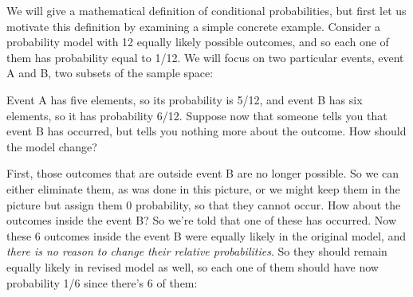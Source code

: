 \documentclass[pdftex, brazil, 12pt, twoside]{article}
\begin{document}
We will give a mathematical definition of conditional
probabilities, but first let us motivate this definition by
examining a simple concrete example.
Consider a probability model with 12 equally likely
possible outcomes, and so each one of them has probability
equal to 1/12.
We will focus on two particular events, event A and
B, two subsets of the sample space:

\begin{figure}[H]
  \begin{center}
  \end{center}
\end{figure}

Event A has five elements, so its probability is 5/12, and
event B has six elements, so it has probability 6/12.
Suppose now that someone tells you that event B has occurred,
but tells you nothing more about the outcome.
How should the model change?

\begin{figure}[H]
  \begin{center}
  \end{center}
\end{figure}

First, those outcomes that are outside event B
are no longer possible.
So we can either eliminate them, as was done in this
picture, or we might keep them in the picture but assign them
0 probability, so that they cannot occur.
How about the outcomes inside the event B?
So we're told that one of these has occurred.
Now these 6 outcomes inside the event B were equally
likely in the original model, and \emph{there is no reason to
change their relative probabilities}.
So they should remain equally likely in revised model as
well, so each one of them should have now probability
1/6 since there's 6 of them:
\end{document}
